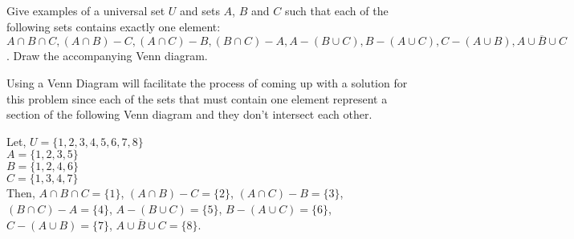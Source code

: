 \documentclass[12pt]{article}
\def\firstcircle{(0,0) circle(2)}
\def\secondcircle{(2,0) circle(2)}
\newenvironment{problem}[2][Problem]{\begin{trivlist}
		\item[\hskip \labelsep {\bfseries #1}\hskip \labelsep {\bfseries #2.}]}{\end{trivlist}}
\newenvironment{solution}[2][Solution]{\begin{trivlist}
		\item[\hskip \labelsep {\bfseries #1}\hskip \labelsep {\bfseries #2.}]}{\end{trivlist}}
\begin{document}
\begin{problem}{35}
	Give examples of a universal set $U$ and sets $A$, $B$ and $C$ such that each of the following sets contains exactly one element: $A\cap B\cap C, (A\cap B)-C, (A\cap C)-B, (B\cap C)-A, A-(B\cup C), B-(A\cup C), C- (A \cup B), \overline{A\cup B\cup C}$. Draw the accompanying Venn diagram.
	\begin{solution}{}
		Using a Venn Diagram will facilitate the process of coming up with a solution for this problem since each of the sets that must contain one element represent a section of the following Venn diagram and they don't intersect each other.
		\begin{center}
	\end{center}
		Let, $U=\{1,2,3,4,5,6,7,8\}$\\
		$A=\{1,2,3,5\}$\\
		$B=\{1,2,4,6\}$\\
		$C=\{1,3,4,7\}$\\
		Then, $A\cap B\cap C= \{1\}$, $(A\cap B)-C=\{2\}$, $(A\cap C)-B=\{3\}$, $(B\cap C)-A=\{4\}$, $A-(B\cup C)=\{5\}$, $B-(A\cup C)=\{6\}$, $C-(A\cup B)=\{7\}$, $\overline{A\cup B\cup C}=\{8\}$.
	\end{solution}
\end{problem}
\end{document}
